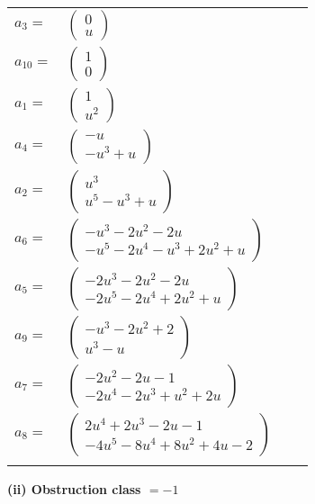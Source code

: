 \documentclass[1p]{elsarticle_modified}
\theoremstyle{definition}
\begin{document}
\begin{tabular}{m{7pt} m{180pt} m{7pt} m{180pt} }
\flushright $a_{3}=$&$\begin{pmatrix}0\\u\end{pmatrix}$ \\
\flushright $a_{10}=$&$\begin{pmatrix}1\\0\end{pmatrix}$ \\
\flushright $a_{1}=$&$\begin{pmatrix}1\\u^2\end{pmatrix}$ \\
\flushright $a_{4}=$&$\begin{pmatrix}- u\\- u^3+u\end{pmatrix}$ \\
\flushright $a_{2}=$&$\begin{pmatrix}u^3\\u^5- u^3+u\end{pmatrix}$ \\
\flushright $a_{6}=$&$\begin{pmatrix}- u^3-2 u^2-2 u\\- u^5-2 u^4- u^3+2 u^2+u\end{pmatrix}$ \\
\flushright $a_{5}=$&$\begin{pmatrix}-2 u^3-2 u^2-2 u\\-2 u^5-2 u^4+2 u^2+u\end{pmatrix}$ \\
\flushright $a_{9}=$&$\begin{pmatrix}- u^3-2 u^2+2\\u^3- u\end{pmatrix}$ \\
\flushright $a_{7}=$&$\begin{pmatrix}-2 u^2-2 u-1\\-2 u^4-2 u^3+u^2+2 u\end{pmatrix}$ \\
\flushright $a_{8}=$&$\begin{pmatrix}2 u^4+2 u^3-2 u-1\\-4 u^5-8 u^4+8 u^2+4 u-2\end{pmatrix}$\\&\end{tabular}
\flushleft \textbf{(ii) Obstruction class $= -1$}\\~\\
\end{document}
